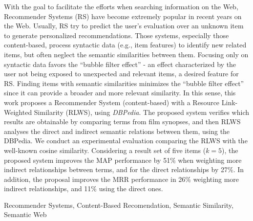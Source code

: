 With the goal to facilitate the efforts when searching information on the Web, Recommender Systems (RS) have become extremely popular in recent years on the Web. Usually, RS try to predict the user’s evaluation over an unknown item to generate personalized recommendations. Those systems, especially those content-based, process syntactic data (e.g., item features) to identify new related items, but often neglect the semantic similarities between them. Focusing only on syntactic data favors the “bubble filter effect” - an effect characterized by the user not being exposed to unexpected and relevant items, a desired feature for RS. Finding items with semantic similarities minimizes the “bubble filter effect” since it can provide a broader and more relevant similarity. In this sense, this work proposes a Recommender System (content-based) with a Resource Link-Weighted Similarity (RLWS), using \textit{DBPedia}. The proposed system verifies which results are obtainable by comparing terms from film synopses, and then RLWS analyses the direct and indirect semantic relations between them, using the DBPedia. We conduct an experimental evaluation comparing the RLWS with the well-known cosine similarity. Considering a result set of five items ($k=5$), the proposed system improves the MAP performance by 51\% when weighting more indirect relationships between terms, and for the direct relationships by 27\%. In addition, the proposal improves the MRR performance in 26\% weighting more indirect relationships, and 11\% using the direct ones.

\begin{keywords}
	Recommender Systems, Content-Based Recomendation, Semantic Similarity, Semantic Web
\end{keywords}